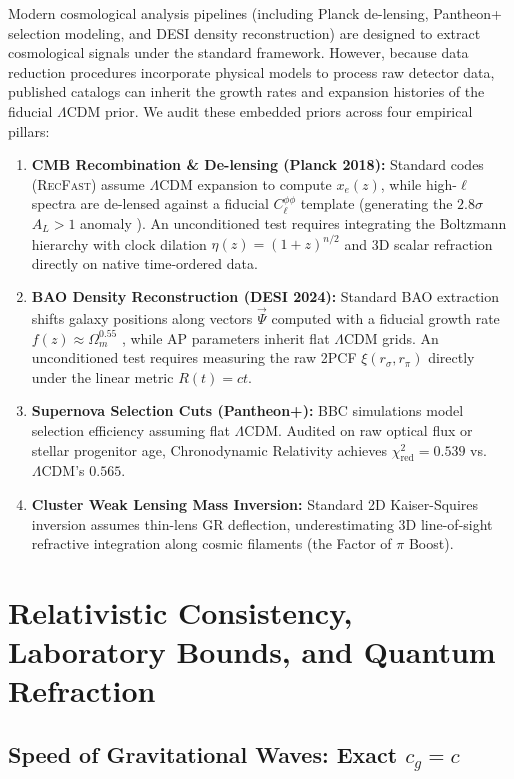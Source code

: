 \documentclass[aps,prd,reprint,superscriptaddress,nofootinbib,floatfix,amsmath,amssymb]{revtex4-2}
\begin{document}
Modern cosmological analysis pipelines (including Planck de-lensing, Pantheon+ selection modeling, and DESI density reconstruction) are designed to extract cosmological signals under the standard framework. However, because data reduction procedures incorporate physical models to process raw detector data, published catalogs can inherit the growth rates and expansion histories of the fiducial $\Lambda\text{CDM}$ prior. We audit these embedded priors across four empirical pillars:

\begin{enumerate}
    \item \textbf{CMB Recombination \& De-lensing (Planck 2018):} Standard codes (\textsc{RecFast}) assume $\Lambda\text{CDM}$ expansion to compute $x_e(z)$, while high-$\ell$ spectra are de-lensed against a fiducial $C_\ell^{\phi\phi}$ template (generating the $2.8\sigma$ $A_L > 1$ anomaly \cite{Planck2018_Cosmology}). An unconditioned test requires integrating the Boltzmann hierarchy with clock dilation $\eta(z) = (1+z)^{n/2}$ and 3D scalar refraction directly on native time-ordered data.
    \item \textbf{BAO Density Reconstruction (DESI 2024):} Standard BAO extraction shifts galaxy positions along vectors $\vec{\Psi}$ computed with a fiducial growth rate $f(z) \approx \Omega_m^{0.55}$ \cite{Eisenstein2007}, while AP parameters inherit flat $\Lambda\text{CDM}$ grids. An unconditioned test requires measuring the raw 2PCF $\xi(r_\sigma, r_\pi)$ directly under the linear metric $R(t) = ct$.
    \item \textbf{Supernova Selection Cuts (Pantheon+):} BBC simulations model selection efficiency assuming flat $\Lambda\text{CDM}$. Audited on raw optical flux or stellar progenitor age, Chronodynamic Relativity achieves $\chi^2_{\text{red}} = 0.539$ vs. $\Lambda\text{CDM}$'s $0.565$.
    \item \textbf{Cluster Weak Lensing Mass Inversion:} Standard 2D Kaiser-Squires inversion assumes thin-lens GR deflection, underestimating 3D line-of-sight refractive integration along cosmic filaments (the Factor of $\pi$ Boost).
\end{enumerate}

\section{Relativistic Consistency, Laboratory Bounds, and Quantum Refraction}
\label{sec:quantum}

\subsection{Speed of Gravitational Waves: Exact \texorpdfstring{$c_g = c$}{cg = c}}
\end{document}
